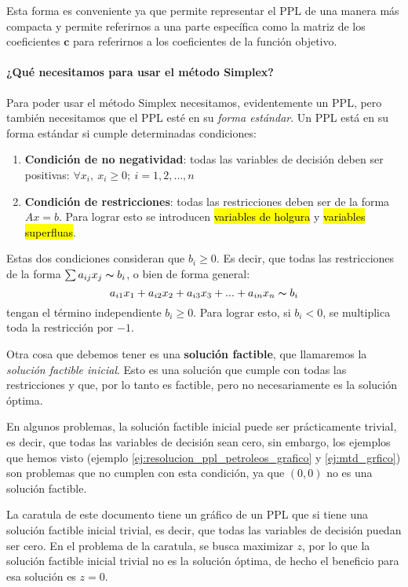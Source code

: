 Esta forma es conveniente ya que permite representar el PPL de una manera más compacta y permite referirnos a una parte específica como la matriz de los coeficientes \(\mathbf{c}\) para referirnos a los coeficientes de la función objetivo.

\paragraph{¿Qué necesitamos para usar el método Simplex?}

Para poder usar el método Simplex necesitamos, evidentemente un PPL, pero también necesitamos que el PPL esté en su \textit{forma estándar}. Un PPL está en su forma estándar si cumple determinadas condiciones:
\begin{enumerate}
  \item \textbf{Condición de no negatividad}: todas las variables de decisión deben ser positivas: \(\forall x_i,\ x_i \geq 0;\ i = 1,2,\ldots,n\)
  \item \textbf{Condición de restricciones}: todas las restricciones deben ser de la forma \(Ax = b\). Para lograr esto se introducen \hl{variables de holgura} y \hl{variables superfluas}.
\end{enumerate}
Estas dos condiciones consideran que \(b_i \geq 0\). Es decir, que todas las restricciones de la forma \(\sum a_{ij} x_{j} \thicksim b_i\), o bien de forma general:
\[
  a_{i1}x_1 + a_{i2}x_2 + a_{i3}x_3 + ... + a_{in}x_n \thicksim b_i
\]
tengan el término independiente \(b_i \geq 0\). Para lograr esto, si \(b_i < 0\), se multiplica toda la restricción por \(-1\).

Otra cosa que debemos tener es una \textbf{solución factible}, que llamaremos la \textit{solución factible inicial}. Esto es una solución que cumple con todas las restricciones y que, por lo tanto es factible, pero no necesariamente es la solución óptima. 

En algunos problemas, la solución factible inicial puede ser prácticamente trivial, es decir, que todas las variables de decisión sean cero, sin embargo, los ejemplos que hemos visto (ejemplo \ref{ej:resolucion_ppl_petroleos_grafico} y \ref{ej:mtd_grfico}) son problemas que no cumplen con esta condición, ya que \((0,0)\) no es una solución factible. 

\begin{tcolorbox}[interesting_data, title=Dato curioso]
  La caratula de este documento tiene un gráfico de un PPL que si tiene una solución factible inicial trivial, es decir, que todas las variables de decisión puedan ser cero. En el problema de la caratula, se busca maximizar \(z\), por lo que la solución factible inicial trivial no es la solución óptima, de hecho el beneficio para esa solución es \(z = 0\). 
\end{tcolorbox}


